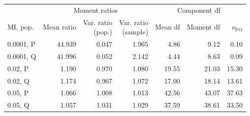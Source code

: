 \begin{tabular}{@{}lrrrrrr@{}}
\toprule
& \multicolumn{3}{c}{Moment ratios} & \multicolumn{3}{c}{Component df}\\
\cmidrule(lr){2-4}\cmidrule(l){5-7}
MI, pop. & Mean ratio & \shortstack{Var. ratio\\(pop.)} & \shortstack{Var. ratio\\(sample)} & Mean df & Moment df & \(\nu_{\mathrm{FO}}\)\\
\midrule
0.0001, P & 44.939 & 0.047 & 1.965 & 4.86 & 9.12 & 0.10\\
0.0001, Q & 41.996 & 0.052 & 2.142 & 4.44 & 8.63 & 0.09\\
0.02, P & 1.190 & 0.970 & 1.080 & 19.55 & 21.03 & 15.30\\
0.02, Q & 1.174 & 0.967 & 1.072 & 17.00 & 18.14 & 13.61\\
0.05, P & 1.066 & 1.008 & 1.013 & 42.56 & 43.07 & 37.63\\
0.05, Q & 1.057 & 1.031 & 1.029 & 37.59 & 38.61 & 33.50\\
\bottomrule
\end{tabular}
